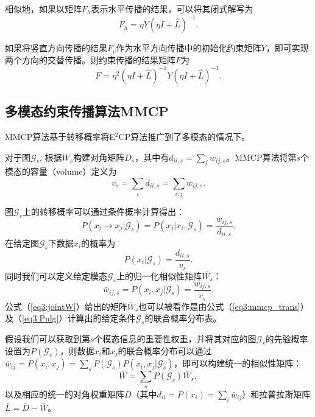相似地，如果以矩阵$F_h$表示水平传播的结果，可以将其闭式解写为
\begin{equation}
{F}_h = \eta{Y}(\eta{I}+\hat{{L}})^{-1}.
\end{equation}

如果将竖直方向传播的结果$F_v$作为水平方向传播中的初始化约束矩阵$Y$，即可实现两个方向的交替传播。则约束传播的结果矩阵$F$为
\begin{equation}
{F} = \eta^2(\eta{I}+\hat{{L}})^{-1}{Y}(\eta{I}+\hat{{L}})^{-1}.
\label{eq3:e2cp}
\end{equation}

\subsection{多模态约束传播算法MMCP}
MMCP算法基于转移概率将E$^2$CP算法推广到了多模态的情况下。

对于图$\mathcal{G}_s$, 根据${W}_s$构建对角矩阵${D}_s$，其中有$d_{ii,s} = \sum_j w_{ij,s}$。MMCP算法将第$s$个模态的容量（volume）定义为
\begin{equation}
v_s = \sum_i d_{ii,s} = \sum_{i,j}w_{ij,s}.
\end{equation}

图$\mathcal{G}_s$上的转移概率可以通过条件概率计算得出：
\begin{equation}
	P(x_i\rightarrow x_j|\mathcal{G}_s) = P(x_j|x_i,\mathcal{G}_s) = \frac{w_{ij,s}}{d_{ii,s}}.
	\label{eq3:mmcp_trans}
\end{equation}
在给定图$\mathcal{G}_s$下数据$x_i$的概率为
\begin{equation}
P(x_i|\mathcal{G}_s) = \frac{d_{ii,s}}{v_s}.
\label{eq3:Pulg}
\end{equation}
同时我们可以定义给定模态$\mathcal{G}_s$上的归一化相似性矩阵$\bar{W_s}$：
\begin{equation}
    \bar{w}_{ij,s} = P(x_i, x_j|\mathcal{G}_s) = \frac{{w}_{ij,s}}{v_s}.
    \label{eq3:jointW}
\end{equation}
公式（\ref{eq3:jointW}）给出的矩阵$\bar{W}_s$也可以被看作是由公式（\ref{eq3:mmcp_trans}）及（\ref{eq3:Pulg}）计算出的给定条件$\mathcal{G}_s$的联合概率分布表。

假设我们可以获取到第$s$个模态信息的重要性权重，并将其对应的图$\mathcal{G}_s$的先验概率设置为$ P(\mathcal{G}_s) $，则数据$x_i$和$x_j$的联合概率分布可以通过$ \bar{w}_{ij}= P(x_i, x_j) = \sum_s P(\mathcal{G}_s) P(x_i, x_j|\mathcal{G}_s) $，即可以构建统一的相似性矩阵：
\begin{equation}
\bar{{W}} = \sum_s P(\mathcal{G}_s)\bar{{W}}_s, 
\label{eq3:unifiedW}
\end{equation}
以及相应的统一的对角权重矩阵$ \bar{{D}}$（其中$ \bar{d}_{ii} = P(x_i) =\sum_i \bar{w}_{ij}$）和拉普拉斯矩阵$ \bar{{L}} = \bar{{D}}-\bar{{W}}$。

